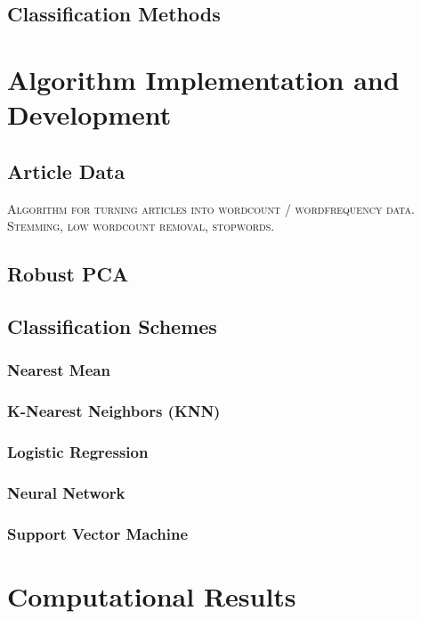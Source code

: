 \documentclass{article}
\newcommand{\comment}[1]{\textsc{\color[rgb]{1,0,0}#1}}
\begin{document}
\subsection{Classification Methods}
\section{Algorithm Implementation and Development}

\subsection{Article Data}

\comment{Algorithm for turning articles into wordcount / wordfrequency data. Stemming, low wordcount removal, stopwords.}

\subsection{Robust PCA}

\subsection{Classification Schemes}

\subsubsection{Nearest Mean}

\subsubsection{K-Nearest Neighbors (KNN)}

\subsubsection{Logistic Regression}

\subsubsection{Neural Network}

\subsubsection{Support Vector Machine}

\section{Computational Results}
\end{document}
